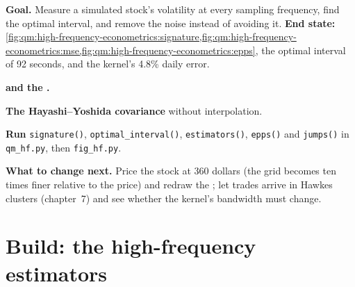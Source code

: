 \begin{tutorial}
\textbf{Goal.} Measure a simulated stock's volatility at every sampling frequency, find the optimal interval, and remove the noise instead of avoiding it.
\textbf{End state:} \cref{fig:qm:high-frequency-econometrics:signature,fig:qm:high-frequency-econometrics:mse,fig:qm:high-frequency-econometrics:epps}, the optimal interval of 92
seconds, and the kernel's 4.8\% daily error.
\begin{tutsteps}
\item \textbf{ and the .}
\label{lst:qm:high-frequency-econometrics:tsrv}
\item \textbf{The Hayashi--Yoshida covariance} without interpolation.
\label{lst:qm:high-frequency-econometrics:hy}
\item \textbf{Run} \texttt{signature()}, \texttt{optimal\_interval()}, \texttt{estimators()}, \texttt{epps()} and \texttt{jumps()} in \texttt{qm\_hf.py}, then
\texttt{fig\_hf.py}.
\end{tutsteps}
\textbf{What to change next.} Price the stock at 360 dollars (the grid becomes ten times finer relative to the price) and redraw the ; let trades arrive in
Hawkes clusters (chapter~7) and see whether the kernel's bandwidth must change.
\end{tutorial}

\section{Build: the high-frequency estimators}\label{bld:qm:high-frequency-econometrics:hfvol}

